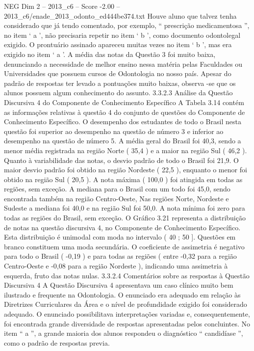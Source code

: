 \begin{textsample}{NEG Dim 2 – 2013\_c6 – Score -2.00 – 2013\_c6/enade\_2013\_odonto\_ed444be374.txt}
Houve aluno que talvez tenha considerado que já tendo comentado, por exemplo, “ prescrição medicamentosa ”, no item ‘ a ’, não precisaria repetir no item ‘ b ’, como documento odontolegal exigido.
O prontuário assinado apareceu muitas vezes no item ‘ b ’, mas era exigido no item ‘ a ’.
A média das notas da Questão 3 foi muito baixa, denunciando a necessidade de melhor ensino nessa matéria pelas Faculdades ou Universidades que possuem cursos de Odontologia no nosso país.
Apesar do padrão de respostas ter levado a pontuações muito baixas, observa -se que os alunos possuem algum conhecimento do assunto. 3.3.2.3 Análise da Questão Discursiva 4 do Componente de Conhecimento Específico A Tabela 3.14 contém as informações relativas à questão 4 do conjunto de questões do Componente de Conhecimento Específico.
O desempenho dos estudantes de todo o Brasil nesta questão foi superior ao desempenho na questão de número 3 e inferior ao desempenho na questão de número 5.
A média geral do Brasil foi 40,3, sendo a menor média registrada na região Norte ( 35,4 ) e a maior na região Sul ( 46,2 ).
Quanto à variabilidade das notas, o desvio padrão de todo o Brasil foi 21,9.
O maior desvio padrão foi obtido na região Nordeste ( 22,5 ), enquanto o menor foi obtido na região Sul ( 20,5 ).
A nota máxima ( 100,0 ) foi atingida em todas as regiões, sem exceção.
A mediana para o Brasil com um todo foi 45,0, sendo encontrada também na região Centro-Oeste, Nas regiões Norte, Nordeste e Sudeste a mediana foi 40,0 e na região Sul foi 50,0.
A nota mínima foi zero para todas as regiões do Brasil, sem exceção.
O Gráfico 3.21 representa a distribuição de notas na questão discursiva 4, no Componente de Conhecimento Específico.
Esta distribuição é unimodal com moda no intervalo ( 40 ; 50 ].
Questões em branco constituem uma moda secundária.
O coeficiente de assimetria é negativo para todo o Brasil ( -0,19 ) e para todas as regiões ( entre -0,32 para a região Centro-Oeste e -0,08 para a região Nordeste ), indicando uma assimetria à esquerda, fruto das notas nulas. 3.3.2.4 Comentários sobre as respostas à Questão Discursiva 4 A Questão Discursiva 4 apresentava um caso clínico muito bem ilustrado e frequente na Odontologia.
O enunciado era adequado em relação às Diretrizes Curriculares da Área e o nível de profundidade exigido foi considerado adequado.
O enunciado possibilitava interpretações variadas e, consequentemente, foi encontrada grande diversidade de respostas apresentadas pelos concluintes.
No item “ a ”, a grande maioria dos alunos respondeu o diagnóstico “ candidíase ”, como o padrão de respostas previa.

\end{textsample}
